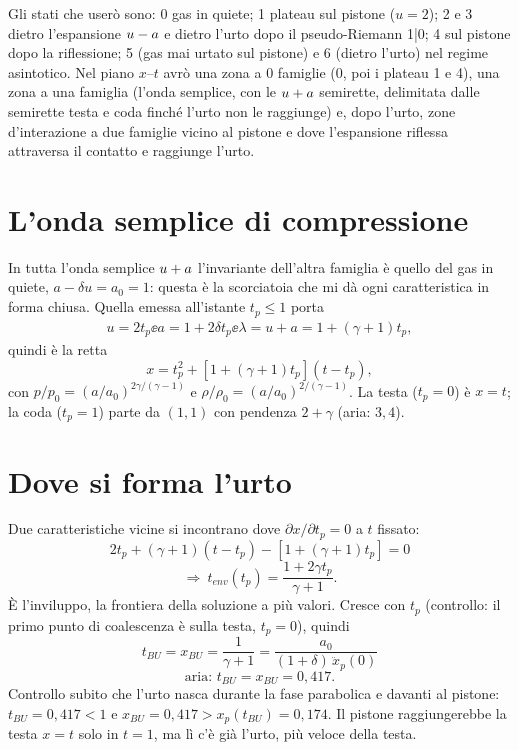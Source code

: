 Gli stati che userò sono: 0 gas in quiete; 1 plateau sul pistone ($u=2$); 2 e 3 dietro l'espansione $u-a$ e dietro
l'urto dopo il pseudo-Riemann 1|0; 4 sul pistone dopo la riflessione; 5 (gas mai urtato sul pistone) e 6 (dietro
l'urto) nel regime asintotico. Nel piano $x$--$t$ avrò una zona a 0 famiglie (0, poi i plateau 1 e 4), una zona a una
famiglia (l'onda semplice, con le $u+a$ semirette, delimitata dalle semirette testa e coda finché l'urto non le
raggiunge) e, dopo l'urto, zone d'interazione a due famiglie vicino al pistone e dove l'espansione riflessa attraversa
il contatto e raggiunge l'urto.

\section*{L'onda semplice di compressione}
In tutta l'onda semplice $u+a$ l'invariante dell'altra famiglia è quello del gas in quiete, $a-\delta u=a_0=1$:
questa è la scorciatoia che mi dà ogni caratteristica in forma chiusa. Quella emessa all'istante $t_p\le1$ porta
\begin{gather*}
u=2t_p \ee a=1+2\delta t_p \ee \lambda=u+a=1+(\gamma+1)t_p,
\end{gather*}
quindi è la retta
\[
x=t_p^2+\left[1+(\gamma+1)t_p\right](t-t_p),
\]
con $p/p_0=(a/a_0)^{2\gamma/(\gamma-1)}$ e $\rho/\rho_0=(a/a_0)^{2/(\gamma-1)}$. La testa ($t_p=0$) è $x=t$; la coda
($t_p=1$) parte da $(1,1)$ con pendenza $2+\gamma$ (aria: $3{,}4$).

\section*{Dove si forma l'urto}
Due caratteristiche vicine si incontrano dove $\partial x/\partial t_p=0$ a $t$ fissato:
\[
2t_p+(\gamma+1)(t-t_p)-\left[1+(\gamma+1)t_p\right]=0
\]
\[
\Rightarrow\ t_{env}(t_p)=\frac{1+2\gamma t_p}{\gamma+1}.
\]
È l'inviluppo, la frontiera della soluzione a più valori. Cresce con $t_p$ (controllo: il primo punto di coalescenza
è sulla testa, $t_p=0$), quindi
\[
t_{BU}=x_{BU}=\frac{1}{\gamma+1}=\frac{a_0}{(1+\delta)\,\ddot x_p(0)}
\]
\[
\text{aria: } t_{BU}=x_{BU}=0{,}417.
\]
Controllo subito che l'urto nasca durante la fase parabolica e davanti al pistone: $t_{BU}=0{,}417<1$ e
$x_{BU}=0{,}417>x_p(t_{BU})=0{,}174$. Il pistone raggiungerebbe la testa $x=t$ solo in $t=1$, ma lì c'è già l'urto,
più veloce della testa.


